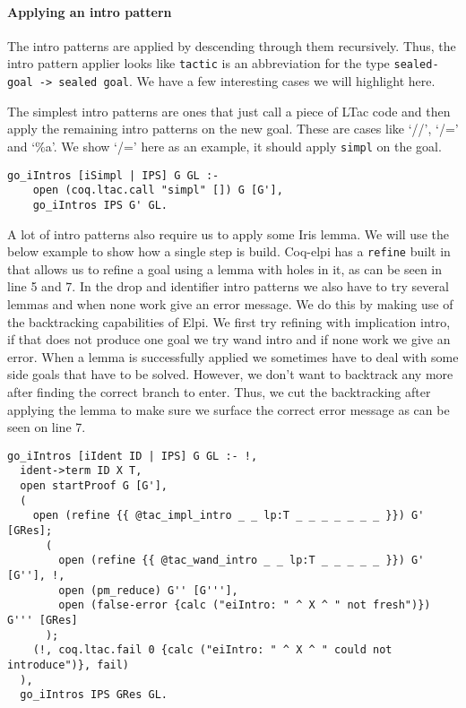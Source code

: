 \documentclass[thesis.tex]{subfiles}
\begin{document}
{{{\paragraph*{Applying an intro pattern}
The intro patterns are applied by descending through them recursively. Thus, the intro pattern applier looks like  \texttt{tactic} is an abbreviation for the type \texttt{sealed-goal -> sealed goal}. We have a few interesting cases we will highlight here.

The simplest intro patterns are ones that just call a piece of LTac code and then apply the remaining intro patterns on the new goal. These are cases like `//', `/=' and `\%a'. We show `/=' here as an example, it should apply \texttt{simpl} on the goal.
\begin{verbatim}
go_iIntros [iSimpl | IPS] G GL :-
    open (coq.ltac.call "simpl" []) G [G'],
    go_iIntros IPS G' GL.
\end{verbatim}

A lot of intro patterns also require us to apply some Iris lemma. We will use the below example to show how a single step is build. Coq-elpi has a \texttt{refine} built in that allows us to refine a goal using a lemma with holes in it, as can be seen in line 5 and 7. In the drop and identifier intro patterns we also have to try several lemmas and when none work give an error message. We do this by making use of the backtracking capabilities of Elpi. We first try refining with implication intro, if that does not produce one goal we try wand intro and if none work we give an error. When a lemma is successfully applied we sometimes have to deal with some side goals that have to be solved. However, we don't want to backtrack any more after finding the correct branch to enter. Thus, we cut the backtracking after applying the lemma to make sure we surface the correct error message as can be seen on line 7.
\begin{verbatim}
go_iIntros [iIdent ID | IPS] G GL :- !,
  ident->term ID X T,
  open startProof G [G'],
  (
    open (refine {{ @tac_impl_intro _ _ lp:T _ _ _ _ _ _ _ }}) G' [GRes];
      (
        open (refine {{ @tac_wand_intro _ _ lp:T _ _ _ _ _ }}) G' [G''], !,
        open (pm_reduce) G'' [G'''],
        open (false-error {calc ("eiIntro: " ^ X ^ " not fresh")}) G''' [GRes]
      );
    (!, coq.ltac.fail 0 {calc ("eiIntro: " ^ X ^ " could not introduce")}, fail)
  ),
  go_iIntros IPS GRes GL.
\end{verbatim}

}}}
\end{document}
